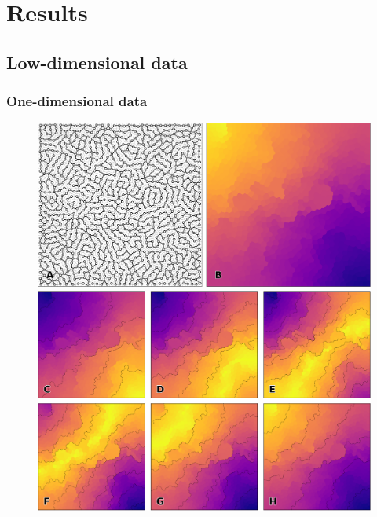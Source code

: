 \section{Results}


\subsection{Low-dimensional data}

\subsubsection*{One-dimensional data}

\begin{figure}
  \includegraphics[width=\columnwidth]{figures/vsom-scalar-1.pdf}

  \vspace{2mm}
  
  \includegraphics[width=\columnwidth]{figures/vsom-scalar-2.pdf}

  \vspace{2mm}
  

\end{figure}
